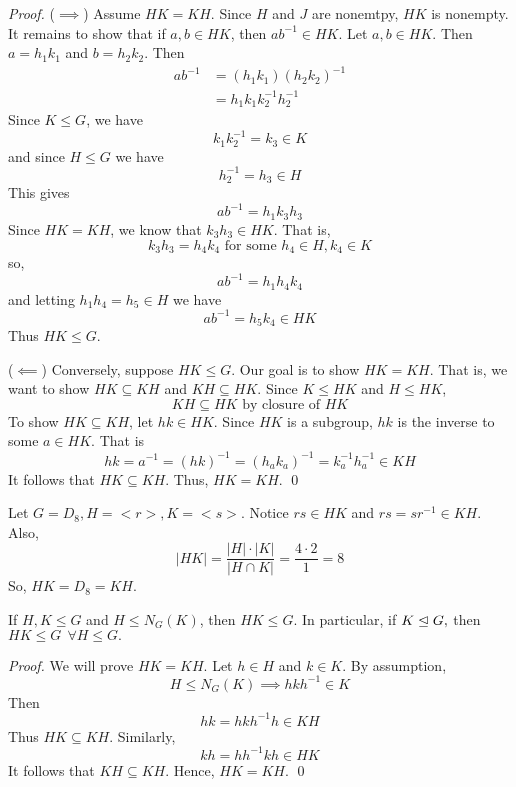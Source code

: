 \begin{proof}
    ($\implies$) Assume $HK=KH$. Since $H$ and $J$ are nonemtpy, $HK$ is nonempty. It remains to show that if $a,b \in HK$, then $ab^{-1} \in HK$. Let $a,b \in HK$. Then $a = h_1k_1$ and $b = h_2k_2$. Then 
    \begin{align*}
        ab^{-1} &= (h_1k_1)(h_2k_2)^{-1} \\
        &= h_1k_1k_2^{-1}h_2^{-1}
    \end{align*}
    Since $K \leq G$, we have
    $$k_1k_2^{-1} = k_3 \in K$$
    and since $H \leq G$ we have 
    $$h_2^{-1} = h_3 \in H$$
    This gives
    $$ab^{-1}=h_1k_3h_3$$
    Since $HK=KH$, we know that $k_3h_3 \in HK$. That is,
    $$k_3h_3 = h_4k_4 \text{ for some } h_4\in H, k_4 \in K$$
    so,
    $$ab^{-1} = h_1h_4k_4$$
    and letting $h_1h_4 = h_5 \in H$ we have 
    $$ab^{-1} = h_5k_4 \in HK$$
    Thus $HK \leq G$.

    ($\impliedby$) Conversely, suppose $HK \leq G$. Our goal is to show $HK=KH$. That is, we want to show $HK \subseteq KH$ and $KH \subseteq HK$. Since $K \leq HK$ and $H \leq HK$,
    $$KH \subseteq HK \text{ by closure of } HK$$
    To show $HK \subseteq KH$, let $hk \in HK$. Since $HK$ is a subgroup, $hk$ is the inverse to some $a \in HK.$ That is
    $$hk = a^{-1} = (hk)^{-1} = (h_ak_a)^{-1} = k_a^{-1}h_a^{-1} \in KH$$
    It follows that $HK \subseteq KH$. Thus, $HK = KH$.
    \qed
\end{proof}

\begin{example}
    Let $G=D_8, H = <r>, K = <s>$. Notice $rs \in HK$ and $rs = sr^{-1} \in KH.$ Also,
    $$|HK| = \frac{|H|\cdot |K|}{|H\cap K|} = \frac{4\cdot 2}{1}=8$$
    So, $HK = D_8 = KH$.
\end{example}

\begin{corollary}
    If $H,K \leq G$ and $H \leq N_G(K)$, then $HK \leq G$. In particular, if $K \trianglelefteq G,$ then $HK \leq G ~~\forall H \leq G.$
\end{corollary}

\begin{proof}
    We will prove $HK = KH$. Let $h \in H$ and $k \in K$. By assumption,
    $$H \leq N_G(K) \implies hkh^{-1} \in K$$
    Then 
    $$hk = hkh^{-1}h \in KH$$
    Thus $HK \subseteq KH.$ Similarly,
    $$kh = hh^{-1}kh \in HK$$
    It follows that $KH \subseteq KH$. Hence, $HK = KH$.
    \qed
\end{proof}

